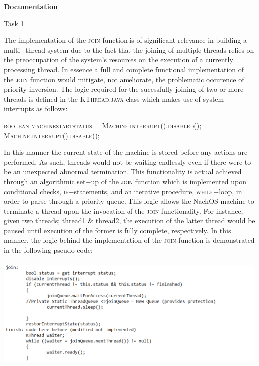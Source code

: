 \documentclass[12pt]{article}
\begin{document}
{\setlength{\parindent}{0cm}
\textbf{Documentation}\\
\begin{center}Task 1\end{center}
The implementation of the \textsc{join} function is of significant relevance in building a multi$-$thread system due to the fact that the joining of multiple threads relies on the preoccupation of the system's resources on the execution of a currently processing thread. In essence a full and complete functional implementation of the \textsc{join} function would mitigate, not ameliorate, the problematic occurence of priority inversion. The logic required for the sucessfully joining of two or more threads is defined in the \textsc{KThread.java} class which makes use of system interrupts as follows: \begin{center}\textsc{boolean machine\underline{\hspace{.3cm}}start\underline{\hspace{.3cm}}status = Machine.interrupt().disabled(); \\ Machine.interrupt().disable();}\end{center} In this manner the current state of the machine is stored before any actions are performed. As such, threads would not be waiting endlessly even if there were to be an unexpected abnormal termination. This functionality is actual achieved through an algorithmic set$-$up of the \textsc{join} function which is implemented upon conditional checks, \textsc{if}$-$statements, and an iterative procedure, \textsc{while}$-$loop, in order to parse through a priority queue. This logic allows the NachOS machine to terminate a thread upon the invocation of the \textsc{join} functionality. For instance, given two threads; thread\underline{\hspace{.3cm}}1 \& thread\underline{\hspace{.3cm}}2, the execution of the latter thread would be paused until execution of the former is fully complete, respectively. In this manner, the logic behind the implementation of the \textsc{join} function is demonstrated in the following pseudo-code:\\
\\ \includegraphics[width=180mm]{pic1.png} \\ 
}
\end{document}
